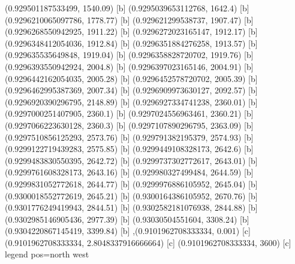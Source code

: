 {{{(0.929501187533499, 1540.09) [b] 
(0.9295039653112768, 1642.4) [b] 
(0.9296210065097786, 1778.77) [b] 
(0.929621299538737, 1907.47) [b] 
(0.9296268550942925, 1911.22) [b] 
(0.9296272023165147, 1912.17) [b] 
(0.9296348412054036, 1912.84) [b] 
(0.9296351884276258, 1913.57) [b] 
(0.929635535649848, 1919.04) [b] 
(0.9296358828720702, 1919.76) [b] 
(0.9296393550942924, 2004.8) [b] 
(0.9296397023165146, 2004.91) [b] 
(0.9296442162054035, 2005.28) [b] 
(0.9296452578720702, 2005.39) [b] 
(0.9296462995387369, 2007.34) [b] 
(0.9296909973630127, 2092.57) [b] 
(0.9296920390296795, 2148.89) [b] 
(0.9296927334741238, 2360.01) [b] 
(0.9297000251407905, 2360.1) [b] 
(0.9297024556963461, 2360.21) [b] 
(0.9297066223630128, 2360.3) [b] 
(0.9297107890296795, 2363.09) [b] 
(0.9297510856125293, 2573.76) [b] 
(0.929791382195379, 2574.93) [b] 
(0.9299122719439283, 2575.85) [b] 
(0.9299449108328173, 2642.6) [b] 
(0.9299483830550395, 2642.72) [b] 
(0.9299737302772617, 2643.01) [b] 
(0.9299761608328173, 2643.16) [b] 
(0.929980327499484, 2644.59) [b] 
(0.9299831052772618, 2644.77) [b] 
(0.9299976886105952, 2645.04) [b] 
(0.9300018552772619, 2645.21) [b] 
(0.9300164386105952, 2670.76) [b] 
(0.9301776249419943, 2844.51) [b] 
(0.9302582181076938, 2844.88) [b] 
(0.9302985146905436, 2977.39) [b] 
(0.93030504551604, 3308.24) [b] 
(0.9304220867145419, 3399.84) [b] 
},{(0.9101962708333334, 0.001) [c] 
(0.9101962708333334, 2.8048337916666664) [c] 
(0.9101962708333334, 3600) [c] 
}}}{legend pos=north west}